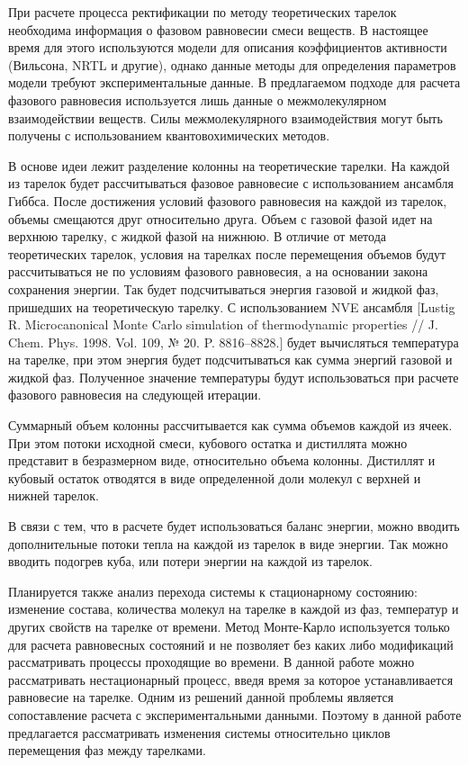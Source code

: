 При расчете процесса ректификации по методу теоретических тарелок необходима информация о фазовом равновесии смеси веществ. В настоящее время для этого используются модели для описания коэффициентов активности (Вильсона, NRTL и другие), однако данные методы для определения параметров модели требуют экспериментальные данные. В предлагаемом подходе для расчета фазового равновесия используется лишь данные о межмолекулярном взаимодействии веществ. Силы межмолекулярного взаимодействия могут быть получены с использованием квантовохимических методов. 

В основе идеи лежит разделение колонны на теоретические тарелки. На каждой из тарелок  будет рассчитываться фазовое равновесие с использованием ансамбля Гиббса. После достижения условий фазового равновесия на каждой из тарелок, объемы смещаются друг относительно друга. Объем с газовой фазой идет на верхнюю тарелку, с жидкой фазой на нижнюю. В отличие от метода теоретических тарелок, условия на тарелках после перемещения объемов будут рассчитываться не по условиям фазового равновесия, а на основании закона сохранения энергии. Так будет подсчитываться энергия газовой и жидкой фаз, пришедших на теоретическую тарелку. С использованием NVE ансамбля [Lustig R. Microcanonical Monte Carlo simulation of thermodynamic properties // J. Chem. Phys. 1998. Vol. 109, № 20. P. 8816–8828.] будет вычисляться температура на тарелке, при этом энергия будет подсчитываться как сумма энергий газовой и жидкой фаз. Полученное значение температуры будут использоваться при расчете фазового равновесия на следующей итерации.

Суммарный объем колонны рассчитывается как сумма объемов каждой из ячеек. При этом потоки исходной смеси, кубового остатка и дистиллята можно представит в безразмерном виде, относительно объема колонны. Дистиллят и кубовый остаток отводятся в виде определенной доли молекул с верхней и нижней тарелок.

В связи с тем, что в расчете будет использоваться баланс энергии, можно вводить дополнительные потоки тепла на каждой из тарелок в виде энергии. Так можно вводить подогрев куба, или потери энергии на каждой из тарелок.

Планируется также анализ перехода системы к стационарному состоянию: изменение состава, количества молекул на тарелке в каждой из фаз, температур и других свойств на тарелке от времени. Метод Монте-Карло используется только для расчета равновесных состояний и не позволяет без каких либо модификаций рассматривать процессы проходящие во времени. В данной работе можно рассматривать нестационарный процесс, введя время за которое устанавливается равновесие на тарелке. Одним из решений данной проблемы является сопоставление расчета с экспериментальными данными. Поэтому в данной работе предлагается рассматривать изменения системы относительно циклов перемещения фаз между тарелками.

